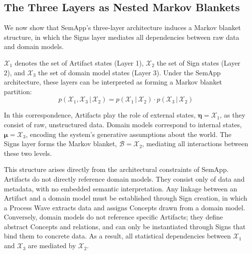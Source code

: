 \documentclass[11pt,a4paper]{article}
\theoremstyle{definition}
\newcommand{\bp}{p}
\newcommand{\bmu}{\bm{\mu}}
\newcommand{\boldeta}{\bm{\eta}}
\begin{document}
\subsection{The Three Layers as Nested Markov Blankets}
\label{sec:nested}

We now show that SemApp's three-layer architecture induces a Markov blanket structure, in which the Signs layer mediates all dependencies between raw data and domain models.

$\mathcal{X}_1$ denotes the set of Artifact states (Layer 1), $\mathcal{X}_2$ the set of Sign states (Layer 2), and $\mathcal{X}_3$ the set of domain model states (Layer 3). Under the SemApp architecture, these layers can be interpreted as forming a Markov blanket partition:
\begin{equation}
\label{eq:nested1}
\bp(\mathcal{X}_1, \mathcal{X}_3 \,|\, \mathcal{X}_2) = \bp(\mathcal{X}_1 \,|\, \mathcal{X}_2) \cdot \bp(\mathcal{X}_3 \,|\, \mathcal{X}_2)
\end{equation}

In this correspondence, Artifacts play the role of external states, $\boldeta = \mathcal{X}_1$, as they consist of raw, unstructured data. Domain models correspond to internal states, $\bmu = \mathcal{X}_3$, encoding the system’s generative assumptions about the world. The Signs layer forms the Markov blanket, $\mathcal{B} = \mathcal{X}_2$, mediating all interactions between these two levels.

This structure arises directly from the architectural constraints of SemApp. Artifacts do not directly reference domain models. They consist only of data and metadata, with no embedded semantic interpretation. Any linkage between an Artifact and a domain model must be established through Sign creation, in which a Process Wave extracts data and assigns Concepts drawn from a domain model. Conversely, domain models do not reference specific Artifacts; they define abstract Concepts and relations, and can only be instantiated through Signs that bind them to concrete data. As a result, all statistical dependencies between $\mathcal{X}_1$ and $\mathcal{X}_3$ are mediated by $\mathcal{X}_2$.
\end{document}
